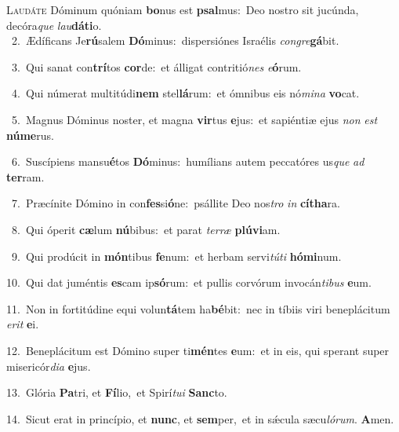 \lettrine{\initial\textcolor{\initialcolor}{L}}{audáte} Dóminum quóniam \textbf{bo}\-nus est \textbf{psal}\-mus:~\star Deo nostro sit jucúnda, decóra\textit{que} \textit{lau}\-\textbf{dá}\textbf{ti}o.\\
{\numbfont\textcolor{\numbcolor}{~2.}}~Ædíficans Je\-\textbf{rú}\-salem \textbf{Dó}\-minus:~\star dispersiónes Israélis \textit{con}\-\textit{gre}\textbf{gá}bit.\par
{\numbfont\textcolor{\numbcolor}{~3.}}~Qui sanat con\-\textbf{trí}\-tos \textbf{cor}\-de:~\star et álligat contritió\textit{nes} \textit{e}\-\textbf{ó}rum.\par
{\numbfont\textcolor{\numbcolor}{~4.}}~Qui númerat multitúdi\textbf{nem} stel\-\textbf{lá}\-rum:~\star et ómnibus eis nó\-\textit{mi}\-\textit{na} \textbf{vo}\-cat.\par
{\numbfont\textcolor{\numbcolor}{~5.}}~Magnus Dóminus noster, et magna \textbf{vir}\-tus \textbf{e}\-jus:~\star et sapiéntiæ ejus \textit{non} \textit{est} \textbf{nú}\-\textbf{me}rus.\par
{\numbfont\textcolor{\numbcolor}{~6.}}~Suscípiens mansu\-\textbf{é}\-tos \textbf{Dó}\-minus:~\star humílians autem peccatóres us\textit{que} \textit{ad} \textbf{ter}\-ram.\par
{\numbfont\textcolor{\numbcolor}{~7.}}~Præcínite Dómino in con\-\textbf{fes}\-si\-\textbf{ó}\-ne:~\star psállite Deo nos\textit{tro} \textit{in} \textbf{cí}\-\textbf{tha}ra.\par
{\numbfont\textcolor{\numbcolor}{~8.}}~Qui óperit \textbf{cæ}\-lum \textbf{nú}\-bibus:~\star et parat \textit{ter}\-\textit{ræ} \textbf{plú}\-\textbf{vi}am.\par
{\numbfont\textcolor{\numbcolor}{~9.}}~Qui prodúcit in \textbf{món}\-tibus \textbf{fe}\-num:~\star et herbam servi\-\textit{tú}\-\textit{ti} \textbf{hó}\-\textbf{mi}num.\par
{\numbfont\textcolor{\numbcolor}{10.}}~Qui dat juméntis \textbf{es}\-cam ip\-\textbf{só}\-rum:~\star et pullis corvórum invocán\-\textit{ti}\-\textit{bus} \textbf{e}\-um.\par
{\numbfont\textcolor{\numbcolor}{11.}}~Non in fortitúdine equi volun\-\textbf{tá}\-tem ha\-\textbf{bé}\-bit:~\star nec in tíbiis viri beneplácitum \textit{e}\-\textit{rit} \textbf{e}\-i.\par
{\numbfont\textcolor{\numbcolor}{12.}}~Beneplácitum est Dómino super ti\-\textbf{mén}\-tes \textbf{e}\-um:~\star et in eis, qui sperant super misericór\-\textit{di}\-\textit{a} \textbf{e}\-jus.\par
{\numbfont\textcolor{\numbcolor}{13.}}~Glória \textbf{Pa}\-tri, et \textbf{Fí}\-lio,~\star et Spirí\-\textit{tu}\-\textit{i} \textbf{Sanc}\-to.\par
{\numbfont\textcolor{\numbcolor}{14.}}~Sicut erat in princípio, et \textbf{nunc}\-, et \textbf{sem}\-per,~\star et in sǽcula sæcu\-\textit{ló}\-\textit{rum}. \textbf{A}\-men.\par
